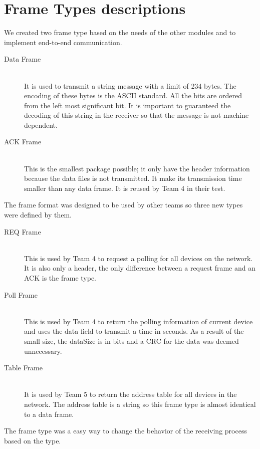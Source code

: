\section{Frame Types descriptions}
We created two frame type based on the needs of the other modules and to implement end-to-end communication.

\begin{description}
  \item[Data Frame] \hfill \\
  It is used to transmit a string message with a limit of 234 bytes. The encoding of these bytes is the ASCII standard. All the bits are ordered from the left most significant bit.
	It is important to guaranteed the decoding of this string in the receiver so that the message is not machine dependent. 
	
  \item[ACK Frame] \hfill \\
  This is the smallest package possible; it only have the header information because the data files is not transmitted. It make its transmission time smaller than any data frame. It is reused by Team 4 in their test. 
\end{description}

The frame format was designed to be used by other teams so three new types were defined by them.
\begin{description}
  \item[REQ Frame] \hfill \\
This is used by Team 4 to request a polling for all devices on the network. It is also only a header, the only difference between a request frame and an ACK is the frame type.
  \item[Poll Frame] \hfill \\
 This is used by Team 4 to return the polling information of current device and uses the data field to transmit a time in seconds. As a result of the small size, the dataSize is in bits and a CRC for the data was deemed unnecessary.
  \item[Table Frame] \hfill \\
 It is used by Team 5 to return the address table for all devices in the network. The address table is a string so this frame type is almost identical to a data frame.

\end{description} 

The frame type was a easy way to change the behavior of the receiving process based on the type.  


